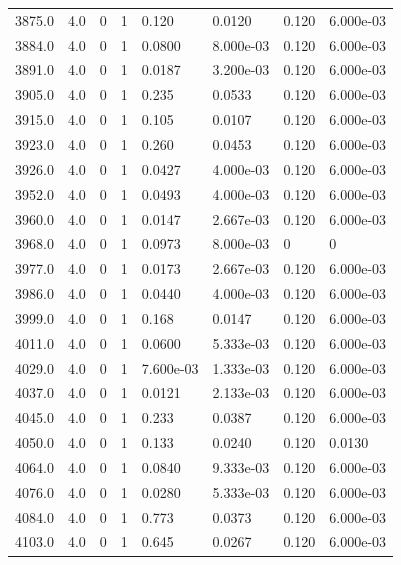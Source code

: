 \documentclass[preview]{standalone}
\begin{document}
{{{{{{{{\begin{tabular}{L{1.2cm}C{1.2cm} C{0.3cm}C{0.5cm} C{1.4cm}C{1.4cm} C{1.4cm}C{1.4cm}}
  3875.0  &   4.0  & 0     &  1 &  0.120  & 0.0120  & 0.120 &  6.000e-03   \\ 
  3884.0  &   4.0  & 0     &  1 &  0.0800  & 8.000e-03  & 0.120 &  6.000e-03   \\ 
  3891.0  &   4.0  & 0     &  1 &  0.0187  & 3.200e-03  & 0.120 &  6.000e-03   \\ 
  3905.0  &   4.0  & 0     &  1 &  0.235  & 0.0533  & 0.120 &  6.000e-03   \\ 
  3915.0  &   4.0  & 0     &  1 &  0.105  & 0.0107  & 0.120 &  6.000e-03   \\ 
  3923.0  &   4.0  & 0     &  1 &  0.260  & 0.0453  & 0.120 &  6.000e-03   \\ 
  3926.0  &   4.0  & 0     &  1 &  0.0427  & 4.000e-03  & 0.120 &  6.000e-03   \\ 
  3952.0  &   4.0  & 0     &  1 &  0.0493  & 4.000e-03  & 0.120 &  6.000e-03   \\ 
  3960.0  &   4.0  & 0     &  1 &  0.0147  & 2.667e-03  & 0.120 &  6.000e-03   \\ 
  3968.0  &   4.0  & 0     &  1 &  0.0973  & 8.000e-03  & 0 &  0   \\ 
  3977.0  &   4.0  & 0     &  1 &  0.0173  & 2.667e-03  & 0.120 &  6.000e-03   \\ 
  3986.0  &   4.0  & 0     &  1 &  0.0440  & 4.000e-03  & 0.120 &  6.000e-03   \\ 
  3999.0  &   4.0  & 0     &  1 &  0.168  & 0.0147  & 0.120 &  6.000e-03   \\ 
  4011.0  &   4.0  & 0     &  1 &  0.0600  & 5.333e-03  & 0.120 &  6.000e-03   \\ 
  4029.0  &   4.0  & 0     &  1 &  7.600e-03  & 1.333e-03  & 0.120 &  6.000e-03   \\ 
  4037.0  &   4.0  & 0     &  1 &  0.0121  & 2.133e-03  & 0.120 &  6.000e-03   \\ 
  4045.0  &   4.0  & 0     &  1 &  0.233  & 0.0387  & 0.120 &  6.000e-03   \\ 
  4050.0  &   4.0  & 0     &  1 &  0.133  & 0.0240  & 0.120 &  0.0130   \\ 
  4064.0  &   4.0  & 0     &  1 &  0.0840  & 9.333e-03  & 0.120 &  6.000e-03   \\ 
  4076.0  &   4.0  & 0     &  1 &  0.0280  & 5.333e-03  & 0.120 &  6.000e-03   \\ 
  4084.0  &   4.0  & 0     &  1 &  0.773  & 0.0373  & 0.120 &  6.000e-03   \\ 
  4103.0  &   4.0  & 0     &  1 &  0.645  & 0.0267  & 0.120 &  6.000e-03   \\ 

\end{tabular}}}}}}}}}
\end{document}
